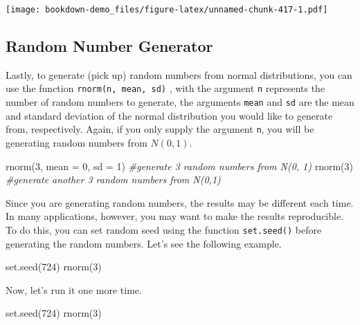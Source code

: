 \documentclass[
]{book}
\newenvironment{Shaded}{\begin{snugshade}}{\end{snugshade}}
\newcommand{\AttributeTok}[1]{\textcolor[rgb]{0.77,0.63,0.00}{#1}}
\newcommand{\CommentTok}[1]{\textcolor[rgb]{0.56,0.35,0.01}{\textit{#1}}}
\newcommand{\DecValTok}[1]{\textcolor[rgb]{0.00,0.00,0.81}{#1}}
\newcommand{\FunctionTok}[1]{\textcolor[rgb]{0.00,0.00,0.00}{#1}}
\newcommand{\NormalTok}[1]{#1}
\begin{document}
\texttt{[image: bookdown-demo\_files/figure-latex/unnamed-chunk-417-1.pdf]}

\hypertarget{rng}{%
\subsection{Random Number Generator}\label{rng}}

Lastly, to generate (pick up) random numbers from normal distributions, you can use the function \texttt{rnorm(n,\ mean,\ sd)} , with the argument \texttt{n} represents the number of random numbers to generate, the arguments \texttt{mean} and \texttt{sd} are the mean and standard deviation of the normal distribution you would like to generate from, respectively. Again, if you only supply the argument \texttt{n}, you will be generating random numbers from \(N(0,1)\).

\begin{Shaded}
\begin{Highlighting}[]
\FunctionTok{rnorm}\NormalTok{(}\DecValTok{3}\NormalTok{, }\AttributeTok{mean =} \DecValTok{0}\NormalTok{, }\AttributeTok{sd =} \DecValTok{1}\NormalTok{) }\CommentTok{\#generate 3 random numbers from N(0, 1)}
\FunctionTok{rnorm}\NormalTok{(}\DecValTok{3}\NormalTok{) }\CommentTok{\#generate another 3 random numbers from N(0,1)}
\end{Highlighting}
\end{Shaded}

Since you are generating random numbers, the results may be different each time. In many applications, however, you may want to make the results reproducible. To do this, you can set random seed using the function \texttt{set.seed()} before generating the random numbers. Let's see the following example.

\begin{Shaded}
\begin{Highlighting}[]
\FunctionTok{set.seed}\NormalTok{(}\DecValTok{724}\NormalTok{)}
\FunctionTok{rnorm}\NormalTok{(}\DecValTok{3}\NormalTok{) }
\end{Highlighting}
\end{Shaded}

Now, let's run it one more time.

\begin{Shaded}
\begin{Highlighting}[]
\FunctionTok{set.seed}\NormalTok{(}\DecValTok{724}\NormalTok{)}
\FunctionTok{rnorm}\NormalTok{(}\DecValTok{3}\NormalTok{) }
\end{Highlighting}
\end{Shaded}
\end{document}
